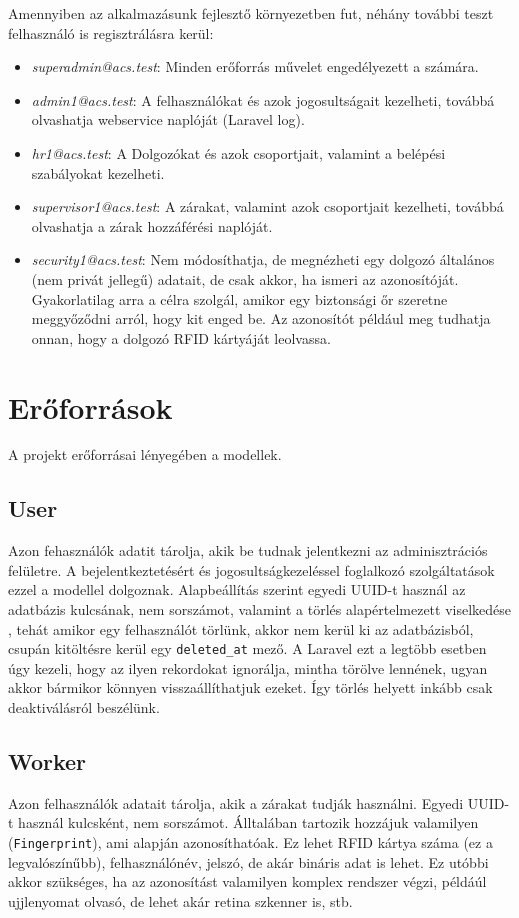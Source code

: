 \documentclass[a4paper,12pt]{thesis-ekf}
\theoremstyle{definition}
\begin{document}
			Amennyiben az alkalmazásunk fejlesztő környezetben fut, néhány további teszt felhasználó is regisztrálásra kerül:
			\begin{itemize}
				\item \emph{superadmin@acs.test}: Minden erőforrás művelet engedélyezett a számára.
				\item \emph{admin1@acs.test}: A felhasználókat és azok jogosultságait kezelheti, továbbá olvashatja webservice naplóját (Laravel log).
				\item \emph{hr1@acs.test}: A Dolgozókat és azok csoportjait, valamint a belépési szabályokat kezelheti.
				\item \emph{supervisor1@acs.test}: A zárakat, valamint azok csoportjait kezelheti, továbbá olvashatja a zárak hozzáférési naplóját.
				\item \emph{security1@acs.test}: Nem módosíthatja, de megnézheti egy dolgozó általános (nem privát jellegű) adatait, de csak akkor, ha ismeri az azonosítóját. \\
				Gyakorlatilag arra a célra szolgál, amikor egy biztonsági őr szeretne meggyőződni arról, hogy kit enged be. Az azonosítót például meg tudhatja onnan, hogy a dolgozó RFID kártyáját leolvassa.
			\end{itemize}
		
		\section{Erőforrások}
			A projekt erőforrásai lényegében a modellek.
			
			\subsection{User}
				Azon fehasználók adatit tárolja, akik be tudnak jelentkezni az adminisztrációs felületre. A bejelentkeztetésért és jogosultságkezeléssel foglalkozó szolgáltatások ezzel a modellel dolgoznak. Alapbeállítás szerint egyedi UUID-t használ az adatbázis kulcsának, nem sorszámot, valamint a törlés alapértelmezett viselkedése , tehát amikor egy felhasználót törlünk, akkor nem kerül ki az adatbázisból, csupán kitöltésre kerül egy \texttt{deleted\_at} mező. A Laravel ezt a legtöbb esetben úgy kezeli, hogy az ilyen rekordokat ignorálja, mintha törölve lennének, ugyan akkor bármikor könnyen visszaállíthatjuk ezeket. Így törlés helyett inkább csak deaktiválásról beszélünk.
				
			\subsection{Worker}
				Azon felhasználók adatait tárolja, akik a zárakat tudják használni. Egyedi UUID-t használ kulcsként, nem sorszámot. Álltalában tartozik hozzájuk valamilyen  (\texttt{Fingerprint}), ami alapján azonosíthatóak. Ez lehet RFID kártya száma (ez a legvalószínűbb), felhasználónév, jelszó, de akár bináris adat is lehet. Ez utóbbi akkor szükséges, ha az azonosítást valamilyen komplex rendszer végzi, példáúl ujjlenyomat olvasó, de lehet akár retina szkenner is, stb.
				
\end{document}
